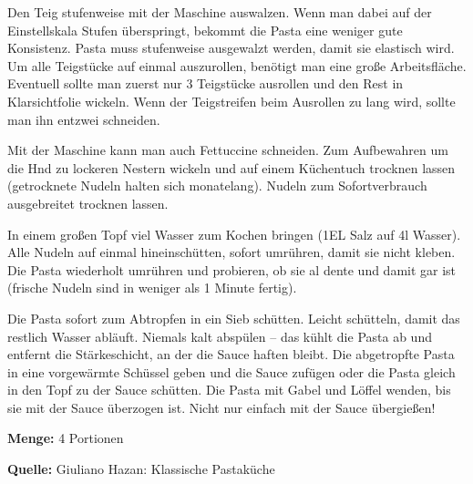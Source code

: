 {Den Teig stufenweise mit der Maschine auswalzen. Wenn man dabei auf der Einstellskala Stufen überspringt, bekommt die Pasta eine weniger gute Konsistenz. Pasta muss stufenweise ausgewalzt werden, damit sie elastisch wird. Um alle Teigstücke auf einmal auszurollen, benötigt man eine große Arbeitsfläche. Eventuell sollte man zuerst nur 3 Teigstücke ausrollen und  den Rest in Klarsichtfolie wickeln. Wenn der Teigstreifen beim Ausrollen zu lang wird, sollte man ihn entzwei schneiden.

Mit der Maschine kann man auch Fettuccine schneiden. Zum Aufbewahren um die Hnd zu lockeren Nestern wickeln und auf einem Küchentuch trocknen lassen (getrocknete Nudeln halten sich monatelang). Nudeln zum Sofortverbrauch ausgebreitet trocknen lassen.

In einem großen Topf viel Wasser zum Kochen bringen (1EL Salz auf 4l Wasser). Alle Nudeln auf einmal hineinschütten, sofort umrühren, damit sie nicht kleben. Die Pasta wiederholt umrühren und probieren, ob sie al dente und damit gar ist (frische Nudeln sind in weniger als 1 Minute fertig).

Die Pasta sofort zum Abtropfen in ein Sieb schütten. Leicht schütteln, damit das restlich Wasser abläuft. Niemals kalt abspülen -- das kühlt die Pasta ab und entfernt die Stärkeschicht, an der die Sauce haften bleibt. Die abgetropfte Pasta in eine vorgewärmte Schüssel geben und die Sauce zufügen oder die Pasta gleich in den Topf zu der Sauce schütten. Die Pasta mit Gabel und Löffel wenden, bis sie mit der Sauce überzogen ist. Nicht nur einfach mit der Sauce übergießen!


{\bfseries Menge:} 4 Portionen

{\bfseries Quelle:} Giuliano Hazan: Klassische Pastaküche 

} 

